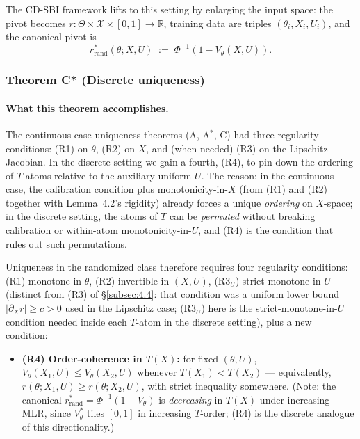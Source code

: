 \documentclass[11pt]{article}
\providecommand{\tightlist}{\setlength{\itemsep}{0pt}\setlength{\parskip}{0pt}}
\begin{document}
The CD-SBI framework lifts to this setting by enlarging the input space:
the pivot becomes
\(r: \Theta \times \mathcal{X} \times [0,1] \to \mathbb{R}\), training
data are triples \((\theta_i, X_i, U_i)\), and the canonical pivot is \[
r^*_\mathrm{rand}(\theta; X, U) \;:=\; \Phi^{-1}(1 - V_\theta(X, U)).
\]

\subsubsection{Theorem C* (Discrete uniqueness)}\label{subsubsec:5.7.2}

\paragraph{What this theorem accomplishes.}
The continuous-case uniqueness theorems (A, A\(^*\), C) had three
regularity conditions: (R1) on \(\theta\), (R2) on \(X\), and (when
needed) (R3) on the Lipschitz Jacobian. In the discrete setting we
gain a fourth, (R4), to pin down the ordering of \(T\)-atoms relative
to the auxiliary uniform \(U\). The reason: in the continuous case, the
calibration condition plus monotonicity-in-\(X\) (from (R1) and (R2)
together with Lemma~4.2's rigidity) already forces a unique
\emph{ordering} on \(X\)-space; in the discrete setting, the atoms of
\(T\) can be \emph{permuted} without breaking calibration or
within-atom monotonicity-in-\(U\), and (R4) is the condition that rules
out such permutations.

Uniqueness in the randomized class therefore requires four regularity
conditions: (R1) monotone in \(\theta\), (R2) invertible in \((X, U)\),
(R3\(_U\)) strict monotone in \(U\) (distinct from (R3) of
\S\ref{subsec:4.4}: that condition was a uniform lower bound
\(|\partial_X r| \ge c > 0\) used in the Lipschitz case; (R3\(_U\))
here is the strict-monotone-in-\(U\) condition needed inside each
\(T\)-atom in the discrete setting), plus a new condition:

\begin{itemize}
\tightlist
\item
  \textbf{(R4) Order-coherence in \(T(X)\):} for fixed \((\theta, U)\),
  \(V_\theta(X_1, U) \le V_\theta(X_2, U)\) whenever
  \(T(X_1) < T(X_2)\) --- equivalently, \(r(\theta; X_1, U) \ge r(\theta; X_2, U)\),
  with strict inequality somewhere. (Note: the canonical \(r^*_\mathrm{rand} = \Phi^{-1}(1 - V_\theta)\)
  is \emph{decreasing} in \(T(X)\) under increasing MLR, since \(V^*_\theta\)
  tiles \([0, 1]\) in increasing \(T\)-order; (R4) is the discrete analogue
  of this directionality.)
\end{itemize}
\end{document}
